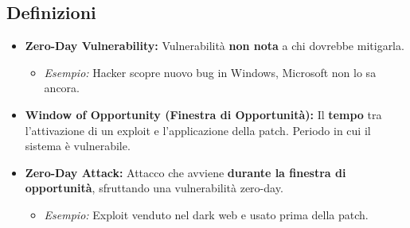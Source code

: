 \subsection{Definizioni}
\begin{itemize}
    \item \textbf{Zero-Day Vulnerability:} Vulnerabilità \textbf{non nota} a chi dovrebbe mitigarla.
        \begin{itemize}
            \item \textit{Esempio:} Hacker scopre nuovo bug in Windows, Microsoft non lo sa ancora.
        \end{itemize}
    \item \textbf{Window of Opportunity (Finestra di Opportunità):} Il \textbf{tempo} tra l'attivazione di un exploit e l'applicazione della patch. Periodo in cui il sistema è vulnerabile.
    \item \textbf{Zero-Day Attack:} Attacco che avviene \textbf{durante la finestra di opportunità}, sfruttando una vulnerabilità zero-day.
        \begin{itemize}
            \item \textit{Esempio:} Exploit venduto nel dark web e usato prima della patch.
        \end{itemize}
\end{itemize}

